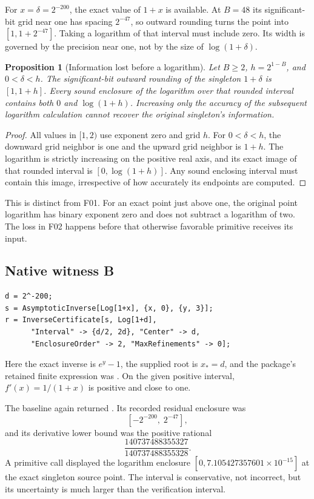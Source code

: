 \documentclass[11pt,letterpaper]{article}
\newcommand{\code}[1]{\texttt{\detokenize{#1}}}
\newtheorem{proposition}{Proposition}[section]
\theoremstyle{remark}\newtheorem{remark}[proposition]{Remark}
\begin{document}
For $x=\delta=2^{-200}$, the exact value of $1+x$ is available. At $B=48$
its significant-bit grid near one has spacing $2^{-47}$, so outward rounding
turns the point into $[1,1+2^{-47}]$. Taking a logarithm of that interval must
include zero. Its width is governed by the precision near one, not by the
size of $\log(1+\delta)$.

\begin{proposition}[Information lost before a logarithm]\label{prop:affineloss}
Let $B\ge2$, $h=2^{1-B}$, and $0<\delta<h$. The significant-bit outward
rounding of the singleton $1+\delta$ is $[1,1+h]$. Every sound enclosure of
the logarithm over that rounded interval contains both $0$ and
$\log(1+h)$. Increasing only the accuracy of the subsequent logarithm
calculation cannot recover the original singleton's information.
\end{proposition}
\begin{proof}
All values in $[1,2)$ use exponent zero and grid $h$. For $0<\delta<h$, the
downward grid neighbor is one and the upward grid neighbor is $1+h$.
The logarithm is strictly increasing on the positive real axis, and its
exact image of that rounded interval is $[0,\log(1+h)]$. Any sound enclosing
interval must contain this image, irrespective of how accurately its
endpoints are computed.
\end{proof}

This is distinct from F01. For an exact point just above one, the original
point logarithm has binary exponent zero and does not subtract a logarithm
of two. The loss in F02 happens before that otherwise favorable primitive
receives its input.

\subsection{Native witness B}
\begin{lstlisting}
d = 2^-200;
s = AsymptoticInverse[Log[1+x], {x, 0}, {y, 3}];
r = InverseCertificate[s, Log[1+d],
      "Interval" -> {d/2, 2d}, "Center" -> d,
      "EnclosureOrder" -> 2, "MaxRefinements" -> 0];
\end{lstlisting}
Here the exact inverse is $e^y-1$, the supplied root is $x_*=d$, and the
package's retained finite expression was \code{y + y^2/2}. On the given
positive interval, $f'(x)=1/(1+x)$ is positive and close to one.

The baseline again returned
\code{Failure["ResidualBracketOutsideInterval", ...]}. Its recorded
residual enclosure was
\[
 [-2^{-200},\;2^{-47}],
\]
and its derivative lower bound was the positive rational
\[
 \frac{140737488355327}{140737488355328}.
\]
A primitive call displayed the logarithm enclosure
$[0,7.105427357601\times10^{-15}]$ at the exact singleton source point.
The interval is conservative, not incorrect, but its uncertainty is much
larger than the verification interval.
\end{document}
